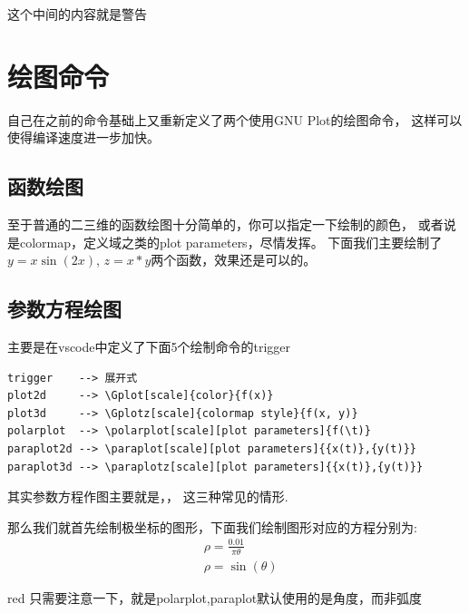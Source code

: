 \documentclass[12pt]{article}
\begin{document}
\begin{warning}
这个中间的内容就是警告
\end{warning}



\section{绘图命令}
自己在之前的命令基础上又重新定义了两个使用GNU Plot的绘图命令，
这样可以使得编译速度进一步加快。

\subsection{函数绘图}
至于普通的二三维的函数绘图十分简单的，你可以指定一下绘制的颜色，
或者说是colormap，定义域之类的plot parameters，尽情发挥。
下面我们主要绘制了 $y=x\sin(2x)$, $z=x*y$两个函数，效果还是可以的。

\begin{center}

\end{center}

\subsection{参数方程绘图}
主要是在vscode中定义了下面5个绘制命令的trigger
\begin{lstlisting}
trigger    --> 展开式
plot2d     --> \Gplot[scale]{color}{f(x)}
plot3d     --> \Gplotz[scale]{colormap style}{f(x, y)}
polarplot  --> \polarplot[scale][plot parameters]{f(\t)}
paraplot2d --> \paraplot[scale][plot parameters]{{x(t)},{y(t)}}
paraplot3d --> \paraplotz[scale][plot parameters]{{x(t)},{y(t)}}
\end{lstlisting}

其实参数方程作图主要就是，，
这三种常见的情形.


那么我们就首先绘制极坐标的图形，下面我们绘制图形对应的方程分别为:
\begin{align}
    & \rho = \frac{0.01}{\pi \theta}\\
    & \rho = \sin(\theta)
\end{align}

\begin{formal}{red}
    只需要注意一下，就是polarplot,paraplot默认使用的是角度，而非弧度
\end{formal}
\end{document}
